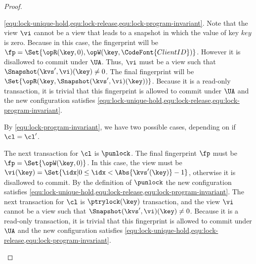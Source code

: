 \begin{proof}
\begin{enumerate}
\begin{enumerate}
\begin{enumerate}
            \cref{equ:lock-unique-hold,equ:lock-release,equ:lock-program-invariant}.
            Note that the view \( \vi \) cannot be a view that leads to a snapshot
            in which the value of key \( key \) is zero.
            Because in this case,
            the fingerprint will be  \( \fp =  \Set{\opR(\key,0), \opW(\key,\CodeFont{ClientID}) }\).
            However it is disallowed to commit under \( \UA \).
            Thus, \( \vi \) must be a view such that \( \Snapshot(\kvs',\vi)(\key) \neq 0 \).
            The final fingerprint will be \( \Set{\opR(\key,\Snapshot(\kvs',\vi)(\key))} \).
            Because it is a read-only transaction,
            it is trivial that this fingerprint is allowed to commit under \( \UA \) and 
            the new configuration satisfies 
            \cref{equ:lock-unique-hold,equ:lock-release,equ:lock-program-invariant}.
        \end{enumerate}
        By \cref{equ:lock-program-invariant}, we have two possible cases, depending on if \( \cl = \cl' \).
        \begin{enumerate}
            The next transaction for \( \cl \)  is \( \punlock \).
            The final fingerprint \( \fp \) must be \( \fp = \Set{\opW(\key,0)} \).
            In this case, the view must be \( \vi(\key) = \Set{\idx | 0 \leq \idx < \Abs{\kvs'(\key)} - 1}\),
            otherwise it is disallowed to commit.
            By the definition of \( \punlock \)
            the new configuration satisfies 
            \cref{equ:lock-unique-hold,equ:lock-release,equ:lock-program-invariant}.
            The next transaction for \( \cl \) is \(\ptrylock(\key) \) transaction,
            and the view \( \vi \) cannot be a view such that \( \Snapshot(\kvs',\vi)(\key) \neq 0 \).
            Because it is a read-only transaction,
            it is trivial that this fingerprint is allowed to commit under \( \UA \) and 
            the new configuration satisfies 
            \cref{equ:lock-unique-hold,equ:lock-release,equ:lock-program-invariant}. \qedhere
        \end{enumerate}
    \end{enumerate}
\end{enumerate}
\end{proof}
